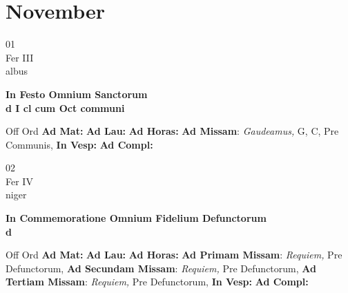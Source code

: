 \documentclass[10pt, openany]{book}
\begin{document}
        \chapter{November}
                        
        \begin{center}
            \begin{minipage}{3.5in}
                \vspace{2em}
                \begin{minipage}{0.5in}
                    {\Huge 01} \\
                    {\normalsize Fer III} \\
                    {\normalsize albus}
                \end{minipage}
                \begin{minipage}{3.0in}
                    \textbf{ \large In Festo Omnium Sanctorum \\
                    \textnormal{\normalsize d I cl cum Oct communi}} \\ 
                \end{minipage}
                \begin{justify}Off Ord
                    \textbf{Ad Mat: }
                    \textbf{Ad Lau: }
                    \textbf{Ad Horas: }\textbf{Ad Missam}: \textit{Gaudeamus,} G, C, Pre Communis,  
                    \textbf{In Vesp: }
                    \textbf{Ad Compl: }
                \end{justify}
            \end{minipage}
        \end{center}
    
        \begin{center}
            \begin{minipage}{3.5in}
                \vspace{2em}
                \begin{minipage}{0.5in}
                    {\Huge 02} \\
                    {\normalsize Fer IV} \\
                    {\normalsize niger}
                \end{minipage}
                \begin{minipage}{3.0in}
                    \textbf{ \large In Commemoratione Omnium Fidelium Defunctorum \\
                    \textnormal{\normalsize d}} \\ 
                \end{minipage}
                \begin{justify}Off Ord
                    \textbf{Ad Mat: }
                    \textbf{Ad Lau: }
                    \textbf{Ad Horas: }\textbf{Ad Primam Missam}: \textit{Requiem,} Pre Defunctorum,  \textbf{Ad Secundam Missam}: \textit{Requiem,} Pre Defunctorum,  \textbf{Ad Tertiam Missam}: \textit{Requiem,} Pre Defunctorum,  
                    \textbf{In Vesp: }
                    \textbf{Ad Compl: }
                \end{justify}
            \end{minipage}
        \end{center}
    
\end{document}
